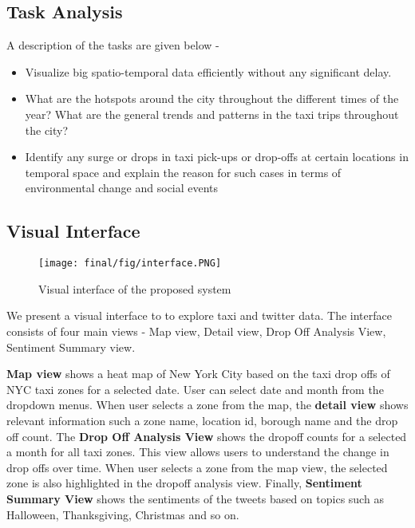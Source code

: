 \subsection{Task Analysis}
A description of the tasks are given below - 
\begin{itemize}
  \item Visualize big spatio-temporal data efficiently without any significant delay.
  \item What are the hotspots around the city throughout the different times of the year? What are the general trends and patterns in the taxi trips throughout the city?
  \item Identify any surge or drops in taxi pick-ups or drop-offs at certain locations in temporal space and explain the reason for such cases in terms of environmental change and social events
\end{itemize}
 
\subsection{Visual Interface}
\begin{figure}[ht]
 \centering %
 \texttt{[image: final/fig/interface.PNG]}
 \caption{Visual interface of the proposed system}
 \label{fig:interface}
\end{figure}
We present a visual interface to to explore taxi and twitter data. The interface consists of four main views - Map view, Detail view, Drop Off Analysis View, Sentiment Summary view. 

\textbf{Map view} shows a heat map of New York City based on the taxi drop offs of NYC taxi zones for a selected date. User can select date and month from the dropdown menus. When user selects a zone from the map, the \textbf{detail view} shows relevant information such a zone name, location id, borough name and the drop off count. The \textbf{Drop Off Analysis View} shows the dropoff counts for a selected a month for all taxi zones. This view allows users to understand the change in drop offs over time. When user selects a zone from the map view, the selected zone is also highlighted in the dropoff analysis view. Finally, \textbf{Sentiment Summary View} shows the sentiments of the tweets based on topics such as Halloween, Thanksgiving, Christmas and so on.

